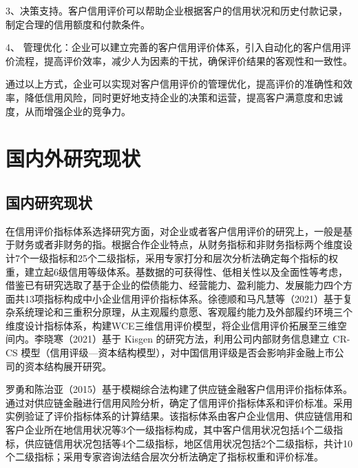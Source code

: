3、决策支持。客户信用评价可以帮助企业根据客户的信用状况和历史付款记录，制定合理的信用额度和付款条件。

4、 管理优化：企业可以建立完善的客户信用评价体系，引入自动化的客户信用评价流程，提高评价效率，减少人为因素的干扰，确保评价结果的客观性和一致性。

通过以上方式，企业可以实现对客户信用评价的管理优化，提高评价的准确性和效率，降低信用风险，同时更好地支持企业的决策和运营，提高客户满意度和忠诚度，从而增强企业的竞争力。

\section{国内外研究现状}

\subsection{国内研究现状}
\nocite{*}
在信用评价指标体系选择研究方面，对企业或者客户信用评价的研究上，一般是基于财务或者非财务的指。\citet{YZJI202206016}根据合作企业特点，从财务指标和非财务指标两个维度设计7个一级指标和25个二级指标，采用专家打分和层次分析法确定每个指标的权重，建立起6级信用等级体系。\citet{XDBY202105045}基数据的可获得性、低相关性以及全面性等考虑，借鉴已有研究选取了基于企业的偿债能力、经营能力、盈利能力、发展能力四个方面共13项指标构成中小企业信用评价指标体系。徐德顺和马凡慧等（2021）基于复杂系统理论和三重积分原理，从主观履约意愿、客观履约能力及外部履约环境三个维度设计指标体系，构建WCE三维信用评价模型，将企业信用评价拓展至三维空间内。李晓寒（2021）基于 Kisgen 的研究方法，利用公司内部财务信息建立 CR-CS 模型（信用评级—资本结构模型），对中国信用评级是否会影响非金融上市公司的资本结构展开研究。
 

罗勇和陈治亚（2015）基于模糊综合法构建了供应链金融客户信用评价指标体系。通过对供应链金融进行信用风险分析，确定了信用评价指标体系和评价标准。采用实例验证了评价指标体系的计算结果。该指标体系由客户企业信用、供应链信用和客户企业所在地信用状况等3个一级指标构成，其中客户信用状况包括4个二级指标，供应链信用状况包括等4个二级指标，地区信用状况包括2个二级指标，共计10个二级指标；采用专家咨询法结合层次分析法确定了指标权重和评价标准。

